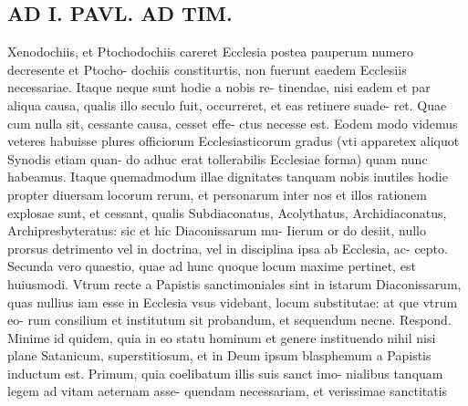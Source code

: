 \documentclass{article}
\begin{document}
\begin{pages}
\section*{AD I. PAVL. AD TIM. }
\marginpar{[ p.290 ]}\pstart Xenodochiis, et Ptochodochiis careret Ecclesia postea pauperum numero decresente et Ptocho- dochiis constiturtis, non fuerunt eaedem Ecclesiis necessariae. Itaque neque sunt hodie a nobis re- tinendae, nisi eadem et par aliqua causa, qualis illo seculo fuit, occurreret, et eas retinere suade- ret. Quae cum nulla sit, cessante causa, cesset effe- ctus necesse est. Eodem modo videmus veteres habuisse plures officiorum Ecclesiasticorum gradus (vti apparetex aliquot Synodis etiam quan- do adhuc erat tollerabilis Ecclesiae forma) quam nunc habeamus. Itaque quemadmodum illae dignitates tanquam nobis inutiles hodie propter diuersam locorum rerum, et personarum inter nos et illos rationem explosae sunt, et cessant, qualis Subdiaconatus, Acolythatus, Archidiaconatus, Archipresbyteratus: sic et hic Diaconissarum mu- Iierum or do desiit, nullo prorsus detrimento vel in doctrina, vel in disciplina ipsa ab Ecclesia, ac- cepto. Secunda vero quaestio, quae ad hunc quoque locum maxime pertinet, est huiusmodi. Vtrum recte a Papistis sanctimoniales sint in istarum Diaconissarum, quas nullius iam esse in Ecclesia vsus videbant, locum substitutae: at que vtrum eo- rum consilium et institutum sit probandum, et sequendum necne. Respond. Minime id quidem, quia in eo statu hominum et genere instituendo nihil nisi plane Satanicum, superstitiosum, et in Deum ipsum blasphemum a Papistis inductum est. Primum, quia coelibatum illis suis sanct imo- nialibus tanquam legem ad vitam aeternam asse- quendam necessariam, et verissimae sanctitatis  \pend

\end{pages}
\end{document}
